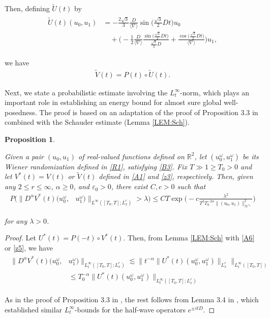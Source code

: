 \documentclass[letterpaper, 11pt,  reqno]{amsart}
\newtheorem{proposition}[theorem]{Proposition}
\newcommand{\1}{\hspace{0.5mm}\text{I}\hspace{0.2mm}}
\newcommand{\noi}{\noindent}
\newcommand{\R}{\mathbb{R}}
\newcommand{\al}{\alpha}
\newcommand{\nb}{\nabla}
\newcommand{\eps}{\varepsilon}
\newcommand{\ld}{\lambda}
\newcommand{\wt}{\widetilde}
\renewcommand{\o}{\omega}
\newcommand{\les}{\lesssim}
\newcommand{\jb}[1]
{\langle #1 \rangle}
\renewcommand{\H}{\mathcal{H}}
\numberwithin{equation}{section}
\numberwithin{theorem}{section}
\begin{document}
\noi
Then, 
\noi
defining $\wt U(t)$ by 
\begin{align*}
\begin{split}
\wt U (t) (u_0, u_1)
& =  - \frac{2\sqrt 3}{3}\frac{D}{\jb{\nb}} 
\sin \big(\tfrac{\sqrt{3}}{2} Dt\big) u_0\\
& \quad 
+ 
\bigg(-\frac 12 \frac{D}{\jb{\nb}}\frac{\sin \big(\tfrac{\sqrt{3}}{2} Dt\big)}{\tfrac{\sqrt{3}}{2} D}
+ \frac{\cos \big(\tfrac{\sqrt{3}}{2} Dt\big)}{\jb{\nb}}
\bigg)
 u_1, 
 \end{split}
\end{align*}

\noi
we have 
\begin{align}
\wt V(t) = P(t) \circ \wt U(t) .
\label{z5}
\end{align}



Next, we state 
 a probabilistic estimate involving the $L^\infty_t$-norm, 
 which plays an important role in establishing an energy bound
 for almost sure global well-posedness.
The proof is based on an adaptation
of the proof of Proposition 3.3 in \cite{OP} combined with the Schauder estimate (Lemma \ref{LEM:Sch}).



\begin{proposition}
\label{PROP:PS2}

Given a pair   $(u_0, u_1)$ of real-valued functions defined on $\R^2$,
let $(u_0^{\omega}, u_1^\omega)$ be its Wiener randomization defined in \eqref{R1}, 
satisfying \eqref{B3}.
Fix $T \gg 1 \geq  T_0 > 0$
and let
$V^*(t) = V(t)$ or $\wt V(t)$ defined in \eqref{A1} and \eqref{z3}, 
respectively.
Then,
given any $2\leq  r\le \infty$, $\al \geq  0$, and $\eps_0 > 0$, 
there exist $C, c>0$ such that
\begin{align*}
P\Big(\|D^\al V^*(t) (u_0^\o,&  u_1^\o) \|_{L^\infty([T_0, T]; L^r_x)}> \ld\Big)
\leq CT \exp\Bigg(-c\frac{\ld^2}{T^2 T_0^{-2\al} \|   (u_0, u_1)  \|_{\H^{\eps_0}}^{2}}\Bigg)
\end{align*}
	
\noi
for any  $\ld > 0$.


\end{proposition}

\begin{proof}
Let $U^*(t) = P(-t) \circ V^*(t)$.
Then, from 
Lemma \ref{LEM:Sch}
with \eqref{A6} or \eqref{z5}, we have 
\begin{align*}
\begin{split}
 \|D^\al V^*(t) (u_0^\o,&  u_1^\o) \|_{L^\infty_t([T_0, T]; L^r_x)} 
 \les 
 \big\| t^{-\al} \|U^* (t) (u_0^\o, u_1^\o) \|_{L^r_x} \big\|_{L^\infty_t([T_0, T])}\\
& \leq 
T_0^{-\al}
 \|U^*(t) (u_0^\o,  u_1^\o) \|_{L^\infty_t([T_0, T]; L^r_x)} 
\end{split}
\end{align*}

\noi
As in the proof of Proposition 3.3 in \cite{OP}, 
the rest follows from Lemma 3.4 in \cite{OP}, 
which established similar $L^\infty_t$-bounds
for the half-wave operators $e^{\pm i tD}$.
\end{proof}
\end{document}
